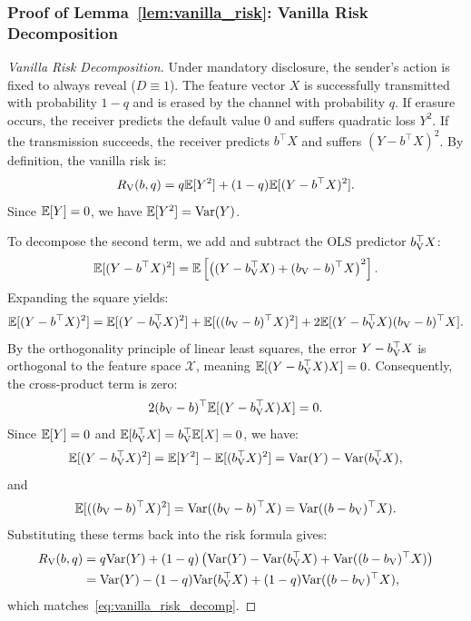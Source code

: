 \subsubsection*{Proof of Lemma~\ref{lem:vanilla_risk}: Vanilla Risk Decomposition}
\label{app:proof_vanilla_risk}
\begin{proof}[Vanilla Risk Decomposition]
Under mandatory disclosure, the sender's action is fixed to always reveal ($D \equiv 1$). The feature vector $X$ is successfully transmitted with probability $1 - q$ and is erased by the channel with probability $q$. If erasure occurs, the receiver predicts the default value $0$ and suffers quadratic loss $Y^2$. If the transmission succeeds, the receiver predicts $b^\top X$ and suffers $(Y - b^\top X)^2$. By definition, the vanilla risk is:
\begin{equation}
    R_{\mathrm{V}}(b, q) = q\mathbb{E}[Y^2] + (1 - q)\mathbb{E}[(Y - b^\top X)^2].
\end{equation}
Since $\mathbb{E}[Y] = 0$, we have $\mathbb{E}[Y^2] = \mathrm{Var}(Y)$. 

To decompose the second term, we add and subtract the OLS predictor $b_{\mathrm{V}}^\top X$:
\begin{equation}
    \mathbb{E}[(Y - b^\top X)^2] = \mathbb{E}\left[ \left( (Y - b_{\mathrm{V}}^\top X) + (b_{\mathrm{V}} - b)^\top X \right)^2 \right].
\end{equation}
Expanding the square yields:
\begin{equation}
    \mathbb{E}[(Y - b^\top X)^2] = \mathbb{E}[(Y - b_{\mathrm{V}}^\top X)^2] + \mathbb{E}[((b_{\mathrm{V}} - b)^\top X)^2] + 2\mathbb{E}[(Y - b_{\mathrm{V}}^\top X)(b_{\mathrm{V}} - b)^\top X].
\end{equation}
By the orthogonality principle of linear least squares, the error $Y - b_{\mathrm{V}}^\top X$ is orthogonal to the feature space $\mathcal{X}$, meaning $\mathbb{E}[(Y - b_{\mathrm{V}}^\top X)X] = 0$. Consequently, the cross-product term is zero:
\begin{equation}
    2(b_{\mathrm{V}} - b)^\top \mathbb{E}[(Y - b_{\mathrm{V}}^\top X)X] = 0.
\end{equation}
Since $\mathbb{E}[Y] = 0$ and $\mathbb{E}[b_{\mathrm{V}}^\top X] = b_{\mathrm{V}}^\top \mathbb{E}[X] = 0$, we have:
\begin{equation}
    \mathbb{E}[(Y - b_{\mathrm{V}}^\top X)^2] = \mathbb{E}[Y^2] - \mathbb{E}[(b_{\mathrm{V}}^\top X)^2] = \mathrm{Var}(Y) - \mathrm{Var}(b_{\mathrm{V}}^\top X),
\end{equation}
and
\begin{equation}
    \mathbb{E}[((b_{\mathrm{V}} - b)^\top X)^2] = \mathrm{Var}((b_{\mathrm{V}} - b)^\top X) = \mathrm{Var}((b - b_{\mathrm{V}})^\top X).
\end{equation}
Substituting these terms back into the risk formula gives:
\begin{align}
    R_{\mathrm{V}}(b, q) &= q\mathrm{Var}(Y) + (1 - q)\left( \mathrm{Var}(Y) - \mathrm{Var}(b_{\mathrm{V}}^\top X) + \mathrm{Var}((b - b_{\mathrm{V}})^\top X) \right) \nonumber \\
    &= \mathrm{Var}(Y) - (1 - q)\mathrm{Var}(b_{\mathrm{V}}^\top X) + (1 - q)\mathrm{Var}((b - b_{\mathrm{V}})^\top X),
\end{align}
which matches~\eqref{eq:vanilla_risk_decomp}. 


\end{proof}
